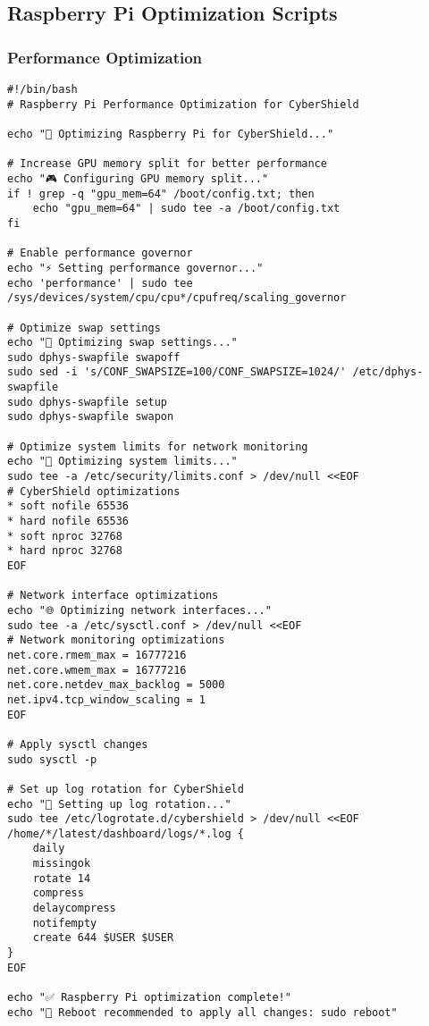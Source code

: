 \documentclass[12pt,a4paper]{report}
\begin{document}
\subsection{Raspberry Pi Optimization Scripts}

\subsubsection{Performance Optimization}

\begin{lstlisting}[style=bashstyle, caption=Raspberry Pi Performance Optimization]
#!/bin/bash
# Raspberry Pi Performance Optimization for CyberShield

echo "🚀 Optimizing Raspberry Pi for CyberShield..."

# Increase GPU memory split for better performance
echo "🎮 Configuring GPU memory split..."
if ! grep -q "gpu_mem=64" /boot/config.txt; then
    echo "gpu_mem=64" | sudo tee -a /boot/config.txt
fi

# Enable performance governor
echo "⚡ Setting performance governor..."
echo 'performance' | sudo tee /sys/devices/system/cpu/cpu*/cpufreq/scaling_governor

# Optimize swap settings
echo "💾 Optimizing swap settings..."
sudo dphys-swapfile swapoff
sudo sed -i 's/CONF_SWAPSIZE=100/CONF_SWAPSIZE=1024/' /etc/dphys-swapfile
sudo dphys-swapfile setup
sudo dphys-swapfile swapon

# Optimize system limits for network monitoring
echo "🔧 Optimizing system limits..."
sudo tee -a /etc/security/limits.conf > /dev/null <<EOF
# CyberShield optimizations
* soft nofile 65536
* hard nofile 65536
* soft nproc 32768
* hard nproc 32768
EOF

# Network interface optimizations
echo "🌐 Optimizing network interfaces..."
sudo tee -a /etc/sysctl.conf > /dev/null <<EOF
# Network monitoring optimizations
net.core.rmem_max = 16777216
net.core.wmem_max = 16777216
net.core.netdev_max_backlog = 5000
net.ipv4.tcp_window_scaling = 1
EOF

# Apply sysctl changes
sudo sysctl -p

# Set up log rotation for CyberShield
echo "📜 Setting up log rotation..."
sudo tee /etc/logrotate.d/cybershield > /dev/null <<EOF
/home/*/latest/dashboard/logs/*.log {
    daily
    missingok
    rotate 14
    compress
    delaycompress
    notifempty
    create 644 $USER $USER
}
EOF

echo "✅ Raspberry Pi optimization complete!"
echo "🔄 Reboot recommended to apply all changes: sudo reboot"
\end{lstlisting}
\end{document}
